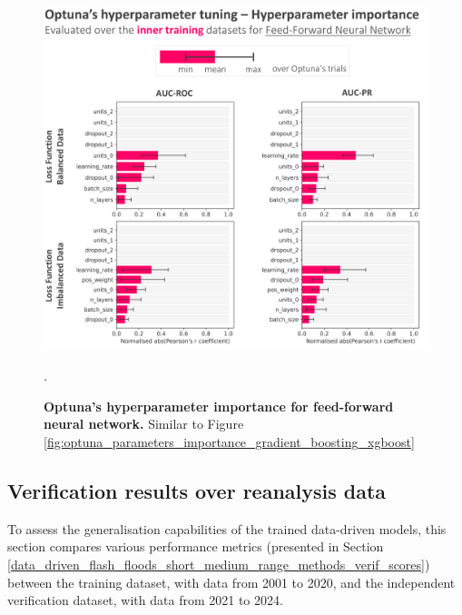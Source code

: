 \begin{figure}[htbp]
\centering
\includegraphics[scale=0.9]{optuna_parameters_importance_feed_forward_nn.png}
\caption{\textbf{Optuna's hyperparameter importance for feed-forward neural network.} Similar to Figure \ref{fig:optuna_parameters_importance_gradient_boosting_xgboost}}.
\label{fig:optuna_parameters_importance_feed_forward_nn}
\end{figure}


\subsection{Verification results over reanalysis data}

To assess the generalisation capabilities of the trained data-driven models, this section compares various performance metrics (presented in Section \ref{data_driven_flash_floods_short_medium_range_methods_verif_scores}) between the \textcolor{colourTraining}{training dataset}, with data from 2001 to 2020, and the independent 
\textcolor{colourTest}{verification dataset}, with data from 2021 to 2024.

